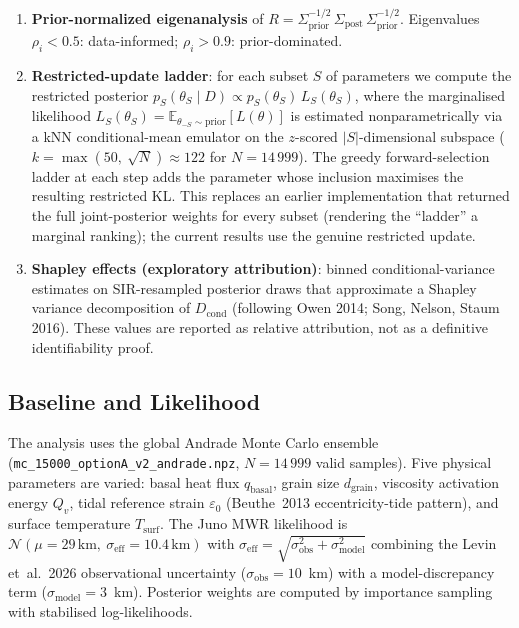 \documentclass[11pt,a4paper]{article}
\begin{document}
\begin{enumerate}
\item \textbf{Prior-normalized eigenanalysis} of
  $R = \Sigma_\mathrm{prior}^{-1/2}\,\Sigma_\mathrm{post}\,\Sigma_\mathrm{prior}^{-1/2}$.
  Eigenvalues $\rho_i < 0.5$: data-informed; $\rho_i > 0.9$: prior-dominated.
\item \textbf{Restricted-update ladder}: for each subset $S$ of parameters we
  compute the restricted posterior $p_S(\theta_S \mid D) \propto p_S(\theta_S) \,
  L_S(\theta_S)$, where the marginalised likelihood
  $L_S(\theta_S) = \mathbb{E}_{\theta_{-S} \sim \mathrm{prior}}[L(\theta)]$ is
  estimated nonparametrically via a kNN conditional-mean emulator on the
  $z$-scored $|S|$-dimensional subspace
  ($k = \max(50,\ \sqrt{N}) \approx 122$ for $N = 14\,999$).  The greedy
  forward-selection ladder at each step adds the parameter whose inclusion
  maximises the resulting restricted KL.  This replaces an earlier
  implementation that returned the full joint-posterior weights for every
  subset (rendering the ``ladder'' a marginal ranking); the current results
  use the genuine restricted update.
\item \textbf{Shapley effects (exploratory attribution)}: binned
  conditional-variance estimates on SIR-resampled posterior draws that
  approximate a Shapley variance decomposition of $D_\mathrm{cond}$ (following
  Owen 2014; Song, Nelson, Staum 2016).  These values are reported as relative
  attribution, not as a definitive identifiability proof.
\end{enumerate}

\subsection{Baseline and Likelihood}

The analysis uses the global Andrade Monte Carlo ensemble
(\texttt{mc\_15000\_optionA\_v2\_andrade.npz}, $N = 14\,999$ valid samples).
Five physical parameters are varied: basal heat flux $q_\mathrm{basal}$,
grain size $d_\mathrm{grain}$, viscosity activation energy $Q_v$, tidal
reference strain $\varepsilon_0$ (Beuthe~2013 eccentricity-tide pattern),
and surface temperature $T_\mathrm{surf}$.  The Juno MWR likelihood is
$\mathcal{N}(\mu = 29\,\mathrm{km},\ \sigma_\mathrm{eff} = 10.4\,\mathrm{km})$
with $\sigma_\mathrm{eff} = \sqrt{\sigma_\mathrm{obs}^2 + \sigma_\mathrm{model}^2}$
combining the Levin et~al.~2026 observational uncertainty
($\sigma_\mathrm{obs} = 10$~km) with a model-discrepancy term
($\sigma_\mathrm{model} = 3$~km).  Posterior weights are computed by
importance sampling with stabilised log-likelihoods.
\end{document}
